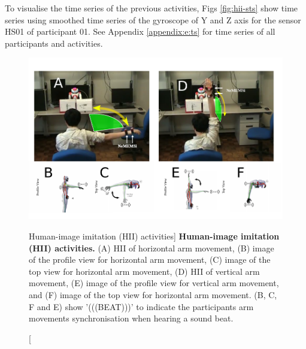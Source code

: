 To visualise the time series of the previous activities, Figs 
\ref{fig:hii-sts} show time series using smoothed time series 
of the gyroscope of Y and Z axis 
for the sensor HS01 of participant 01.
See Appendix \ref{appendix:e:ts} for 
time series of all participants and activities. 
\begin{figure}
  \centering
  \includegraphics[width=1.0\textwidth]{hii}
    \caption
	[Human-image imitation (HII) activities]{
	{\bf Human-image imitation (HII) activities.} 
		(A) HII of horizontal arm movement, 
		(B) image of the profile view for horizontal arm movement,
		(C) image of the top view for horizontal arm movement,
		(D) HII of vertical arm movement, 
		(E) image of the profile view for vertical arm movement, and
		(F) image of the top view for horizontal arm movement.
		(B, C, F and E) show '(((BEAT)))' to indicate the participants
		arm movements synchronisation when hearing a sound beat.
        }
    \label{fig:hii}
\end{figure}
